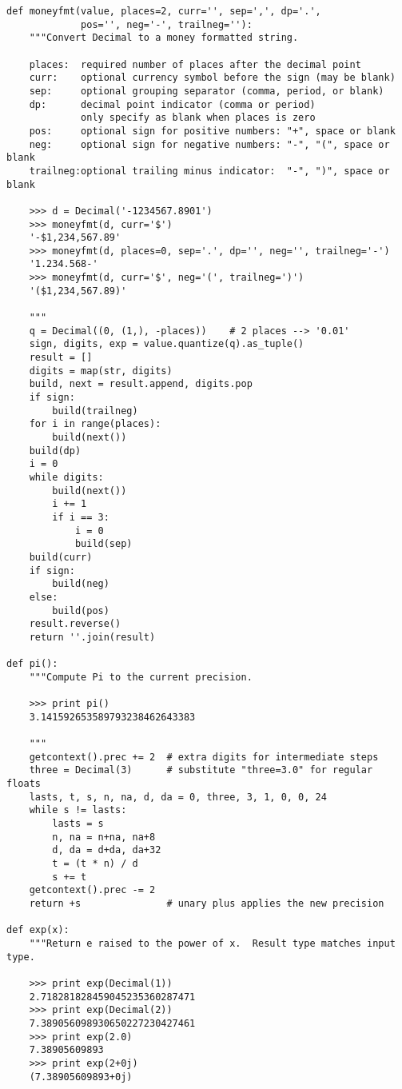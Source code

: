 \begin{verbatim}
def moneyfmt(value, places=2, curr='', sep=',', dp='.',
             pos='', neg='-', trailneg=''):
    """Convert Decimal to a money formatted string.

    places:  required number of places after the decimal point
    curr:    optional currency symbol before the sign (may be blank)
    sep:     optional grouping separator (comma, period, or blank)
    dp:      decimal point indicator (comma or period)
             only specify as blank when places is zero
    pos:     optional sign for positive numbers: "+", space or blank
    neg:     optional sign for negative numbers: "-", "(", space or blank
    trailneg:optional trailing minus indicator:  "-", ")", space or blank

    >>> d = Decimal('-1234567.8901')
    >>> moneyfmt(d, curr='$')
    '-$1,234,567.89'
    >>> moneyfmt(d, places=0, sep='.', dp='', neg='', trailneg='-')
    '1.234.568-'
    >>> moneyfmt(d, curr='$', neg='(', trailneg=')')
    '($1,234,567.89)'
    
    """
    q = Decimal((0, (1,), -places))    # 2 places --> '0.01'
    sign, digits, exp = value.quantize(q).as_tuple()
    result = []
    digits = map(str, digits)
    build, next = result.append, digits.pop
    if sign:
        build(trailneg)
    for i in range(places):
        build(next())
    build(dp)
    i = 0
    while digits:
        build(next())
        i += 1
        if i == 3:
            i = 0
            build(sep)
    build(curr)
    if sign:
        build(neg)
    else:
        build(pos)
    result.reverse()
    return ''.join(result)

def pi():
    """Compute Pi to the current precision.

    >>> print pi()
    3.141592653589793238462643383
    
    """
    getcontext().prec += 2  # extra digits for intermediate steps
    three = Decimal(3)      # substitute "three=3.0" for regular floats
    lasts, t, s, n, na, d, da = 0, three, 3, 1, 0, 0, 24
    while s != lasts:
        lasts = s
        n, na = n+na, na+8
        d, da = d+da, da+32
        t = (t * n) / d
        s += t
    getcontext().prec -= 2
    return +s               # unary plus applies the new precision

def exp(x):
    """Return e raised to the power of x.  Result type matches input type.

    >>> print exp(Decimal(1))
    2.718281828459045235360287471
    >>> print exp(Decimal(2))
    7.389056098930650227230427461
    >>> print exp(2.0)
    7.38905609893
    >>> print exp(2+0j)
    (7.38905609893+0j)
    

\end{verbatim}
